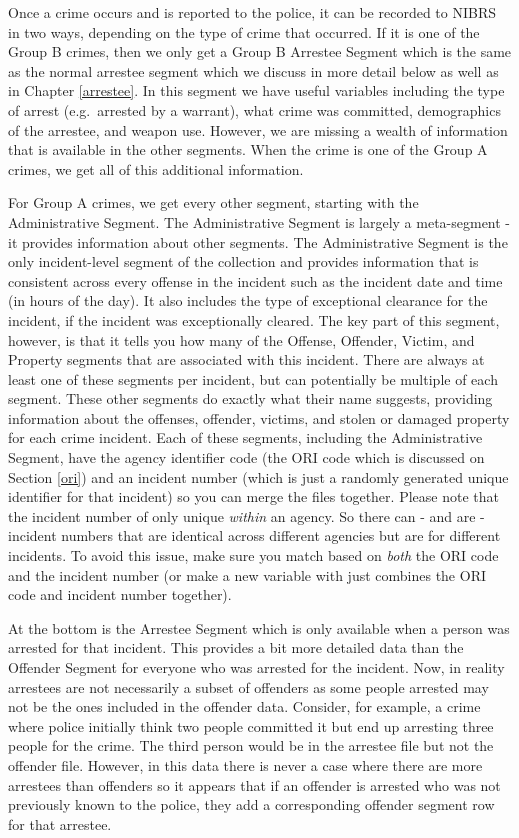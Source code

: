 \documentclass[
]{krantz}
\begin{document}
Once a crime occurs and is reported to the police, it can be
recorded to NIBRS in two ways, depending on the type of
crime that occurred. If it is one of the Group B crimes,
then we only get a Group B Arrestee Segment which is the
same as the normal arrestee segment which we discuss in more
detail below as well as in Chapter \ref{arrestee}. In this
segment we have useful variables including the type of
arrest (e.g.~arrested by a warrant), what crime was
committed, demographics of the arrestee, and weapon use.
However, we are missing a wealth of information that is
available in the other segments. When the crime is one of
the Group A crimes, we get all of this additional
information.

For Group A crimes, we get every other segment, starting
with the Administrative Segment. The Administrative Segment
is largely a meta-segment - it provides information about
other segments. The Administrative Segment is the only
incident-level segment of the collection and provides
information that is consistent across every offense in the
incident such as the incident date and time (in hours of the
day). It also includes the type of exceptional clearance for
the incident, if the incident was exceptionally cleared. The
key part of this segment, however, is that it tells you how
many of the Offense, Offender, Victim, and Property segments
that are associated with this incident. There are always at
least one of these segments per incident, but can
potentially be multiple of each segment. These other
segments do exactly what their name suggests, providing
information about the offenses, offender, victims, and
stolen or damaged property for each crime incident. Each of
these segments, including the Administrative Segment, have
the agency identifier code (the ORI code which is discussed
on Section \ref{ori}) and an incident number (which is just
a randomly generated unique identifier for that incident) so
you can merge the files together. Please note that the
incident number of only unique \emph{within} an agency. So
there can - and are - incident numbers that are identical
across different agencies but are for different incidents.
To avoid this issue, make sure you match based on
\emph{both} the ORI code and the incident number (or make a
new variable with just combines the ORI code and incident
number together).

At the bottom is the Arrestee Segment which is only
available when a person was arrested for that incident. This
provides a bit more detailed data than the Offender Segment
for everyone who was arrested for the incident. Now, in
reality arrestees are not necessarily a subset of offenders
as some people arrested may not be the ones included in the
offender data. Consider, for example, a crime where police
initially think two people committed it but end up arresting
three people for the crime. The third person would be in the
arrestee file but not the offender file. However, in this
data there is never a case where there are more arrestees
than offenders so it appears that if an offender is arrested
who was not previously known to the police, they add a
corresponding offender segment row for that arrestee.
\end{document}
